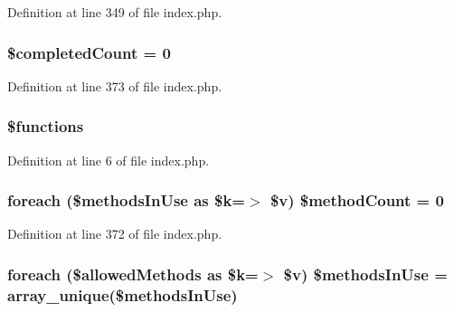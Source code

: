 Definition at line 349 of file index.\-php.

\hypertarget{namespace_pierce_moore_1_1_ruby_p_h_p_a51c734a41c7747051953ec3d78dd1c5b}{
\subsubsection[{\$completed\-Count}]{\setlength{\rightskip}{0pt plus 5cm}\$completed\-Count = 0}}\label{namespace_pierce_moore_1_1_ruby_p_h_p_a51c734a41c7747051953ec3d78dd1c5b}


Definition at line 373 of file index.\-php.

\hypertarget{namespace_pierce_moore_1_1_ruby_p_h_p_aa75daea491817f3b64daa2f51128bcdf}{
\subsubsection[{\$functions}]{\setlength{\rightskip}{0pt plus 5cm}\$functions}}\label{namespace_pierce_moore_1_1_ruby_p_h_p_aa75daea491817f3b64daa2f51128bcdf}


Definition at line 6 of file index.\-php.

\hypertarget{namespace_pierce_moore_1_1_ruby_p_h_p_a56c1b7384519355df73a254a12f0bae3}{
\subsubsection[{\$method\-Count}]{\setlength{\rightskip}{0pt plus 5cm}foreach (\$methods\-In\-Use as \$k=$>$ \$v) \$method\-Count = 0}}\label{namespace_pierce_moore_1_1_ruby_p_h_p_a56c1b7384519355df73a254a12f0bae3}


Definition at line 372 of file index.\-php.

\hypertarget{namespace_pierce_moore_1_1_ruby_p_h_p_a1c475c0c53206fb15c4c3028bb7d5c7c}{
\subsubsection[{\$methods\-In\-Use}]{\setlength{\rightskip}{0pt plus 5cm}foreach (\$allowed\-Methods as \$k=$>$ \$v) \$methods\-In\-Use = array\-\_\-unique(\$methods\-In\-Use)}}\label{namespace_pierce_moore_1_1_ruby_p_h_p_a1c475c0c53206fb15c4c3028bb7d5c7c}


